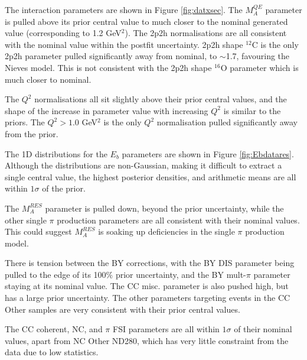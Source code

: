 The interaction parameters are shown in Figure \ref{fig:datxsec}. The $M^{QE}_A$ parameter is pulled above its prior central value to much closer to the nominal generated value (corresponding to 1.2 GeV$^2$). The 2p2h normalisations are all consistent with the nominal value within the postfit uncertainty. 2p2h shape $^{12}$C is the only 2p2h parameter pulled significantly away from nominal, to $\sim$1.7, favouring the Nieves model. This is not consistent with the 2p2h shape $^{16}$O parameter which is much closer to nominal.

The $Q^2$ normalisations all sit slightly above their prior central values, and the shape of the increase in parameter value with increasing $Q^2$ is similar to the priors. The $Q^2>1.0$ GeV$^2$ is the only $Q^2$ normalisation pulled significantly away from the prior.

The 1D distributions for the $E_b$ parameters are shown in Figure \ref{fig:Ebdatares}. Although the distributions are non-Gaussian, making it difficult to extract a single central value, the highest posterior densities, and arithmetic means are all within $1\sigma$ of the prior.

The $M_A^{RES}$ parameter is pulled down, beyond the prior uncertainty, while the other single $\pi$ production parameters are all consistent with their nominal values. This could suggest $M_A^{RES}$ is soaking up deficiencies in the single $\pi$ production model.

There is tension between the BY corrections, with the BY DIS parameter being pulled to the edge of its 100$\%$ prior uncertainty, and the BY mult-$\pi$ parameter staying at its nominal value. The CC misc. parameter is also pushed high, but has a large prior uncertainty. The other parameters targeting events in the CC Other samples are very consistent with their prior central values. 

The CC coherent, NC, and $\pi$ FSI parameters are all within $1\sigma$ of their nominal values, apart from NC Other ND280, which has very little constraint from the data due to low statistics. 

